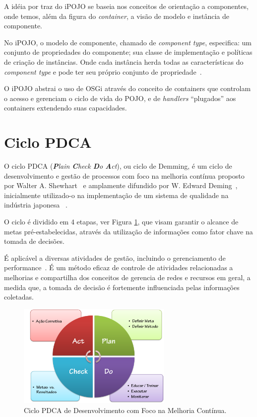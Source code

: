 A idéia por traz do iPOJO se baseia nos conceitos de orientação a componentes, onde temos, além da figura do \textit{container}, a visão de modelo e instância de componente. 

No iPOJO, o modelo de componente, chamado de \textit{component type}, especifica: um conjunto de propriedades do componente; sua classe de implementação e políticas de criação de instâncias. Onde cada instância herda todas as características do \textit{component type} e pode ter seu próprio conjunto de propriedade~\cite{ipojo}.

O iPOJO abstrai o uso de OSGi através do conceito de containers que controlam o acesso e gerenciam o ciclo de vida do POJO, e de \textit{handlers} ``plugados'' aos containers extendendo suas capacidades.


\section{Ciclo PDCA}
\label{sec:pdca}
O ciclo PDCA (\textit{\textbf{P}lain \textbf{C}heck \textbf{D}o \textbf{A}ct}), ou ciclo de  Demming, é um ciclo de desenvolvimento e gestão de processos com foco na melhoria contínua proposto por Walter A. Shewhart~\cite{shewhart} e amplamente difundido por W. Edward Deming~\cite{deming}, inicialmente utilizado-o na implementação de um sistema de qualidade na indústria japonesa ~\cite{fabio2003}.

O ciclo é dividido em 4 etapas, ver Figura \ref{fig:pdca}, que visam garantir o alcance de metas pré-estabelecidas, através da utilização de informações como fator chave na tomada de decisões.

É aplicável a diversas atividades de gestão, incluindo o gerenciamento de performance~\cite{pdcacont}. É um método eficaz de controle de atividades relacionadas a melhorias e compartilha dos conceitos de gerencia de redes e recursos em geral, a medida que, a tomada de decisão é fortemente influenciada pelas informações coletadas.


\begin{figure}[htp]
\centering
\includegraphics[width=7.5cm]{chapters/chapter2/pdca_cycle.png}
\caption[Ciclo PDCA]{Ciclo PDCA de Desenvolvimento com Foco na Melhoria Contínua.}
\label{fig:pdca}
\end{figure}


